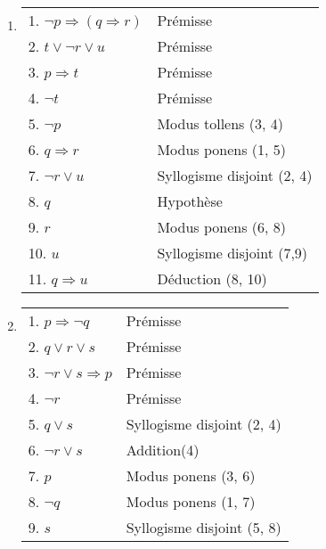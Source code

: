 \begin{enumerate}
	\item  \hspace{1em}
    \begin{center}
    \begin{tabular}{|l|l|}
    \hline
    1. $\lnot p \Rightarrow (q \Rightarrow r)$ & Prémisse \\

    2. $t \lor \lnot r \lor u$ & Prémisse \\
    3. $p \Rightarrow t$ & Prémisse \\
    4. $\lnot t$ & Prémisse \\
    5. $\lnot p$ & Modus tollens (3, 4) \\ 
    6. $q \Rightarrow r$ & Modus ponens (1, 5) \\
    7. $\lnot r \lor u$ & Syllogisme disjoint (2, 4) \\
    \hspace{0.5cm} 8. $q$ & Hypothèse \\
    \hspace{0.5cm} 9. $r$ & Modus ponens (6, 8) \\
    \hspace{0.5cm} 10. $u$ & Syllogisme disjoint (7,9) \\
    11. $q \Rightarrow u$ & Déduction (8, 10) \\
    \hline
    \end{tabular}
    \end{center}
    
	\item  \hspace{1em}
    \begin{center}
    \begin{tabular}{|l|l|}
    \hline
    1. $p \Rightarrow \lnot q$ & Prémisse \\
    2. $q \lor r \lor s$ & Prémisse \\
    3. $\lnot r \lor s \Rightarrow p$ & Prémisse \\
    4. $\lnot r$ & Prémisse \\
    5. $q \lor s$ & Syllogisme disjoint (2, 4) \\
    6. $\lnot r \lor s$ & Addition(4) \\
    7. $p$ & Modus ponens (3, 6) \\
    8. $\lnot q$ & Modus ponens (1, 7) \\
    9. $s$ & Syllogisme disjoint (5, 8) \\
    \hline
    \end{tabular}
    \end{center}
    

\end{enumerate}
